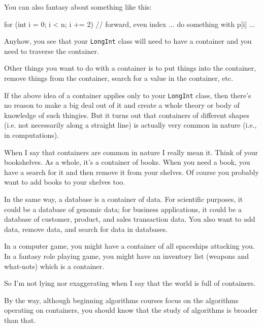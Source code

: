 You can also fantasy about something like this:
\begin{console}[fontsize=\footnotesize]
for (int i = 0; i < n; i += 2) // forward, even index
{
    ... do something with p[i] ...
}
\end{console}

Anyhow, you see that your \verb!LongInt! class will need to 
have a container and you need to traverse the container.

Other things you want to do with a container is to put things
into the container, remove things from the container, 
search for a value in the container, etc.

If the above idea of a container applies only to your \verb!LongInt!
class, then there's no reason to make a big deal out of it and create
a whole theory or body of knowledge of such thingies.
But it turns out that containers of different shapes (i.e. not 
necessarily along a straight line) is actually very common in nature
(i.e., in computations).

When I say that containers are common in nature I really mean it.
Think of your bookshelves.
As a whole, it's a container of books.
When you need a book, you have a search for it and 
then remove it from your shelves.
Of course you probably want to add books to your shelves too.

In the same way, a database is a container of data.
For scientific purposes, it could be a database of genomic data;
for business applications, it could be a database of customer, 
product, and sales transaction data.
You also want to add data, remove data, and search for data in databases. 

In a computer game, you might have a container of all spaceships attacking you.
In a fantasy role playing game, you might have an inventory list
(weapons and what-nots) which is a container.

So I'm not lying nor exaggerating
when I say that the world is full of containers.

By the way, although beginning algorithms courses focus on the
algorithms operating on containers, you should know that the study of
algorithms is broader than that.
